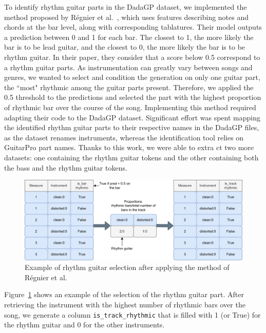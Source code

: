 To identify rhythm guitar parts in the DadaGP dataset, we implemented the method proposed by Régnier et al.~\cite{regnier_identification_2021},
which uses features describing notes and chords at the bar level, along with corresponding tablatures.
Their model outputs a prediction between 0 and 1 for each bar. The closest to 1, the more likely the bar is to be lead guitar, and the closest to 0, the more likely the bar is to be rhythm guitar.
In their paper, they consider that a score below 0.5 correspond to a rhythm guitar parts.
As instrumentation can greatly vary between songs and genres, we wanted to select and condition the generation on only one guitar part, the ``most" rhythmic among the guitar parts present.
Therefore, we applied the 0.5 threshold to the predictions and selected the part with the highest proportion of rhythmic bar over the course of the song.
Implementing this method required adapting their code to the DadaGP dataset.
Significant effort was spent mapping the identified rhythm guitar parts to their respective names in the DadaGP files, as the dataset renames instruments, whereas the identification tool relies on GuitarPro part names.
Thanks to this work, we were able to extra  ct two more datasets: one containing the rhythm guitar tokens and the other containing both the bass and the rhythm guitar tokens.

\begin{figure}[!ht]
    \centering
    \includegraphics[width=0.85\linewidth]{../images-figures/rhythm_guitar_selection.png}
    \caption{Example of rhythm guitar selection after applying the method of Régnier et al.}
    \label{fig:rhythm_guitar_selection}
\end{figure}

Figure~\ref{fig:rhythm_guitar_selection} shows an example of the selection of the rhythm guitar part.
After retrieving the instrument with the highest number of rhythmic bars over the song,
we generate a column \texttt{is\_track\_rhythmic} that is filled with 1 (or True) for the rhythm guitar and 0 for the other instruments.


